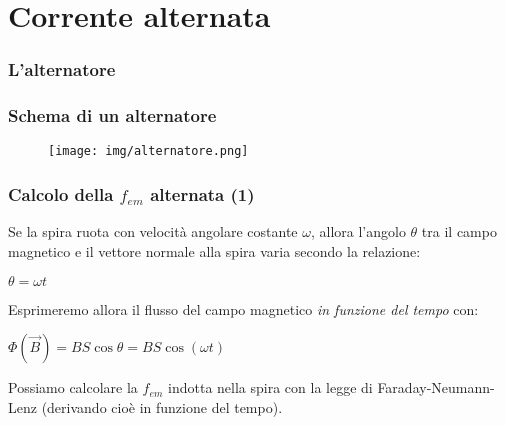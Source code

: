 \documentclass[]{beamer}
\theoremstyle{plain}
\newcommand{\fem}{f_{em}}
\begin{document}
\section{Corrente alternata}

\begin{frame}
  \frametitle{L'alternatore}
  
\end{frame}



\begin{frame}
  \frametitle{Schema di un alternatore}
  \begin{figure}
\texttt{[image: img/alternatore.png]}
\end{figure}
\end{frame}


\begin{frame}
  \frametitle{Calcolo della $ \fem $ alternata (1)}
  Se la spira ruota con velocità angolare costante $ \omega $, allora l'angolo $ \theta $ tra il campo magnetico e il vettore normale alla spira varia secondo la relazione:
\begin{center}
$ \theta = \omega t $
\end{center}\pause
  Esprimeremo allora il flusso del campo magnetico \emph{in funzione del tempo} con:
  \begin{center}
$ \Phi (\vec{B}) = BS \cos\theta = BS\cos(\omega t) $
\end{center}
  \pause
  Possiamo calcolare la $ \fem $ indotta nella spira con la legge di Faraday-Neumann-Lenz (derivando cioè in funzione del tempo).
\end{frame}
\end{document}
